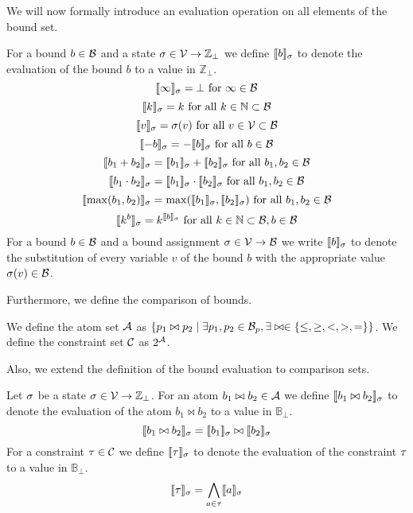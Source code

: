 
We will now formally introduce an evaluation operation on all elements of the bound set.

\begin{definition}
  For a bound $b \in \mathcal{B}$ and a state $\sigma \in \mathcal{V} \rightarrow \mathbb{Z}_\bot$ we define $\llbracket b \rrbracket_{\sigma}$ to denote the evaluation of the bound $b$ to a value in $\mathbb{Z}_\bot$.
  \[ \llbracket \infty \rrbracket_{\sigma} = \bot \text{ for } \infty \in \mathcal{B} \] 
  \[ \llbracket k \rrbracket_{\sigma} = k \text{ for all } k \in \mathbb{N} \subset \mathcal{B} \] 
  \[ \llbracket v \rrbracket_{\sigma} = \sigma(v) \text{ for all } v \in \mathcal{V} \subset \mathcal{B} \] 
  \[ \llbracket -b \rrbracket_{\sigma} = -\llbracket b \rrbracket_{\sigma} \text{ for all } b \in \mathcal{B} \] 
  \[ \llbracket b_1 + b_2 \rrbracket_{\sigma} = \llbracket b_1 \rrbracket_{\sigma} + \llbracket b_2 \rrbracket_{\sigma} \text{ for all } b_1, b_2 \in \mathcal{B} \] 
  \[ \llbracket b_1 \cdot b_2 \rrbracket_{\sigma} = \llbracket b_1 \rrbracket_{\sigma} \cdot \llbracket b_2 \rrbracket_{\sigma} \text{ for all } b_1, b_2 \in \mathcal{B} \] 
  \[ \llbracket \max(b_1, b_2) \rrbracket_{\sigma} = \max(\llbracket b_1 \rrbracket_{\sigma}, \llbracket b_2 \rrbracket_{\sigma}) \text{ for all } b_1, b_2 \in \mathcal{B} \]
  \[ \llbracket k^b \rrbracket_{\sigma} = k^{\llbracket b \rrbracket_{\sigma}} \text{ for all } k \in \mathbb{N} \subset \mathcal{B}, b \in \mathcal{B} \]  
  For a bound $b \in \mathcal{B}$ and a bound assignment $\sigma \in \mathcal{V} \rightarrow \mathcal{B}$ we write $\llbracket b \rrbracket_{\sigma}$ to denote the substitution of every variable $v$ of the bound $b$ with the appropriate value $\sigma(v) \in \mathcal{B}$.
\end{definition}
Furthermore, we define the comparison of bounds.

\begin{definition}
  We define the atom set $\mathcal{A}$ as $\lbrace p_1 \bowtie p_2 \mid \exists p_1, p_2 \in \mathcal{B}_p, \exists \bowtie \in \lbrace \leq, \geq, <, >, = \rbrace \rbrace$.
  We define the constraint set $\mathcal{C}$ as $2^{\mathcal{A}}$.
\end{definition}
Also, we extend the definition of the bound evaluation to comparison sets.

\begin{definition}
  Let $\sigma$ be a state $\sigma \in \mathcal{V} \rightarrow \mathbb{Z}_\bot$.
  For an atom $b_1 \bowtie b_2 \in \mathcal{A}$ we define $\llbracket b_1 \bowtie b_2 \rrbracket_{\sigma}$ to denote the evaluation of the atom $b_1 \bowtie b_2$ to a value in $\mathbb{B}_\bot$.
  \[ \llbracket b_1 \bowtie b_2 \rrbracket_{\sigma} = \llbracket b_1 \rrbracket_{\sigma} \bowtie \llbracket b_2 \rrbracket_{\sigma} \]
  For a constraint $\tau \in \mathcal{C}$ we define $\llbracket \tau \rrbracket_{\sigma}$ to denote the evaluation of the constraint $\tau$ to a value in $\mathbb{B}_\bot$.
  \[ \llbracket \tau \rrbracket_{\sigma} = \bigwedge_{a \in \tau} \llbracket a \rrbracket_{\sigma} \]
\end{definition}
